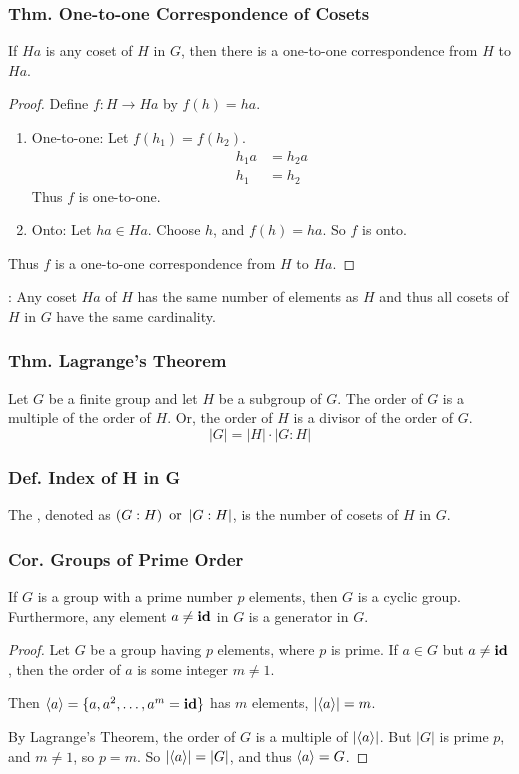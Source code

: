 \subsubsection{Thm. One-to-one Correspondence of Cosets}
If $Ha$ is any coset of $H$ in $G$, then there is a one-to-one correspondence from $H$ to $Ha$.
\begin{proof}
    Define $f: H \rightarrow Ha$ by $f(h) = ha$.
    \begin{enumerate}
        \item One-to-one: Let $f(h_1) = f(h_2)$.
        \begin{align*}
            h_1a & = h_2a \\
            h_1 & = h_2
        \end{align*}
        Thus $f$ is one-to-one.
        \item Onto: Let $ha \in Ha$. Choose $h$, and $f(h) = ha$. So $f$ is onto.
    \end{enumerate}
    Thus $f$ is a one-to-one correspondence from $H$ to $Ha$.
\end{proof}
: Any coset $Ha$ of $H$ has the same number of elements as $H$ and thus all cosets of $H$ in $G$ have the same cardinality.

\subsubsection{Thm. Lagrange's Theorem}
Let $G$ be a finite group and let $H$ be a subgroup of $G$. The order of $G$ is a multiple of the order of $H$. Or, the order of $H$ is a divisor of the order of $G$.
\[
    |G| = |H| \cdot |G:H|
\]

\subsubsection{Def. Index of H in G}
The , denoted as $(G:H) \operatorname{~\text{or}~} |G:H|$, is the number of cosets of $H$ in $G$.

\subsubsection{Cor. Groups of Prime Order}
If $G$ is a group with a prime number $p$ elements, then $G$ is a cyclic group. Furthermore, any element $a \neq \operatorname{\textbf{id}}$ in $G$ is a generator in $G$.
\begin{proof}
    Let $G$ be a group having $p$ elements, where $p$ is prime. If $a \in G$ but $a \neq \operatorname{\textbf{id}}$, then the order of $a$ is some integer $m \neq 1$.

    Then $\langle a \rangle = \{a,a^2,\ldots, a^m = \operatorname{\textbf{id}}\}$ has $m$ elements, $|\langle a \rangle| = m$.

    By Lagrange's Theorem, the order of $G$ is a multiple of $|\langle a \rangle|$. But $|G|$ is prime $p$, and $m \neq 1$, so $p = m$. So $|\langle a \rangle| = |G|$, and thus $\langle a \rangle = G$.
\end{proof}
